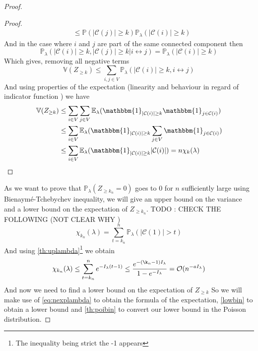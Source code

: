 \begin{proof}
\begin{proof}
\begin{align}
			&\leq \mathbb{P}( |\mathcal{C}(j)| \geq k ) \mathbb{P}_{\lambda}(|\mathcal{C}(i)| \geq k) 
		\end{align}
		And in the case where $i$ and $j$ are part of the same connected component then
		\begin{equation}\label{posval}
			\mathbb{P}_{\lambda}(|\mathcal{C}(i)| \geq k, |\mathcal{C}(j)| \geq k | i \leftrightarrow j)
			=\mathbb{P}_{\lambda}(|\mathcal{C}(i)| \geq k)
		\end{equation}
		Which gives, removing all negative terms
		\begin{equation}
			\mathbb{V}(Z_{\geq k}) \leq \sum_{i,j \in V} \mathbb{P}_{\lambda}(|\mathcal{C}(i)|\geq k, i \leftrightarrow j)
		\end{equation}
		And using properties of the expectation (linearity and behaviour in regard of indicator function ) we have
		\begin{align}
			\mathbb{V}(Z_{\geq k}) &\leq \sum_{i \in V}\sum_{j \in V} \mathbb{E}_{\lambda} ( \mathbbm{1}_{|\mathcal{C}(i)|\geq k} \mathbbm{1}_{j \in \mathcal{C}(i)})\\
				&\leq \sum_{i \in V} \mathbb{E}_{\lambda} ( \mathbbm{1}_{|\mathcal{C}(i)|\geq k} \sum_{j\in V} \mathbbm{1}_{j \in \mathcal{C}(i)}) \\
				&\leq \sum_{i \in V} \mathbb{E}_{\lambda} ( \mathbbm{1}_{|\mathcal{C}(i)|\geq k}  |\mathcal{C}(i)|) = n\chi_k(\lambda) 
		\end{align}
	\end{proof}
	As we want to prove that $\mathbb{P}_{\lambda}(Z_{\geq k_n} = 0)$ goes to 0 for $n$ sufficiently large using Bienaymé-Tchebychev inequality, we will give an upper bound on the variance and a lower bound on the expectation of $Z_{\geq k_n}$.
	TODO : CHECK THE FOLLOWING (NOT CLEAR WHY )
	\begin{equation}
		\chi_{k_n}(\lambda) = \sum_{t=k_n}^{n} \mathbb{P}_{\lambda}(|\mathcal{C}(1)| > t) 
	\end{equation}
	And using \ref{th:uplambda}\footnote{The inequality being strict the -1 appears}  we obtain
	\begin{equation}
		\chi_{k_n}(\lambda) \leq \sum_{t=k_n}^{n} e^{-I_{\lambda}(t-1)} \leq \frac{e^{-(\k_n -1)I_{\lambda}}}{1-e^{-I_{\lambda}}} = \mathcal{O}(n^{-aI_{\lambda}})
	\end{equation}
	And now we need to find a lower bound on the expectation of $Z_{\geq k}$ So we will make use of \ref{eq:nexplambda} to obtain the formula of the expectation, 
	\ref{lowbin} to obtain a lower bound and \ref{th:poibin} to convert our lower bound in the Poisson distribution.

\end{proof}
